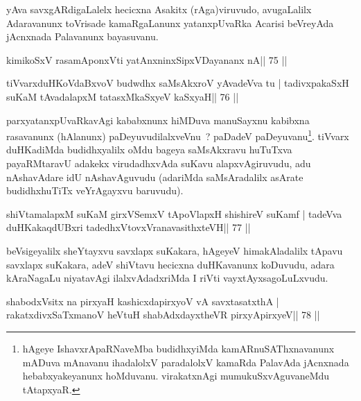 \begin{artha}
yAva savxgARdigaLalelx hecicxna Asakitx (rAga)viruvudo, avugaLalilx Adaravanunx toVrisade kamaRgaLanunx yatanxpUvaRka Acarisi beVreyAda jAcnxnada Palavanunx bayasuvanu.
\end{artha}


\begin{shl}
kimikoSxV rasamAponxVti yatAnxninxSipxVDayananx nA\hfill || 75 ||
\end{shl}

\begin{shl}
tiVvarxduHKoVdaBxvoV budwdhx saMsAkxroV yAvadeVva tu |
tadivxpakaSxH suKaM tAvadalapxM tatasxMkaSxyeV kaSxyaH\hfill || 76 ||
\end{shl}

\begin{artha}
parxyatanxpUvaRkavAgi kababxnunx hiMDuva manuSayxnu kabibxna
rasavanunx (hAlanunx) paDeyuvudilalxveVnu~? paDadeV
paDeyuvanu\footnote[1]{hAgeye IshavxrApaRNaveMba budidhxyiMda
  kamARnuSAThxnavanunx mADuva mAnavanu ihadalolxV paradalolxV kamaRda
  PalavAda jAcnxnada hebabxyakeyanunx hoMduvanu. virakatxnAgi
  mumukuSxvAguvaneMdu tAtapxyaR.}. tiVvarx duHKadiMda budidhxyalilx
oMdu bageya saMsAkxravu huTuTxva payaRMtaravU adakekx virudadhxvAda
suKavu alapxvAgiruvudu, adu nAshavAdare idU nAshavAguvudu (adariMda
saMsAradalilx asArate budidhxhuTiTx veYrAgayxvu baruvudu).
\end{artha}


\begin{shl}
shiVtamalapxM suKaM girxVSemxV tApoV\s lapxH shishireV suKamf |
tadeVva duHKakaqdUBxri tadedhxVtovxVranavasithxteVH\hfill || 77 ||
\end{shl}

\begin{artha}
  beVsigeyalilx sheYtayxvu savxlapx suKakara, hAgeyeV himakAladalilx
  tApavu savxlapx suKakara, adeV shiVtavu hecicxna duHKavanunx
  koDuvudu, adara kAraNagaLu niyatavAgi ilalxvAdadxriMda I
  riVti vayxtAyxsagoLuLxvudu.
\end{artha}

\begin{shl}
shabodxV\s sitx na pirxyaH kashicxdapirxyoV vA savxtasatxthA |
rakatxdivxSaTxmanoV heVtuH shabAdxdayxtheVR pirxyApirxyeV\hfill || 78 ||
\end{shl}

